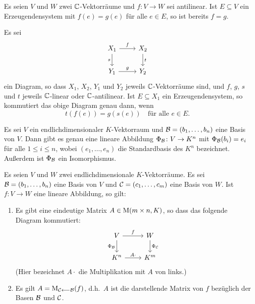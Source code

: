 \documentclass[a4paper,10pt]{article}
\begin{document}
\begin{lemma}
  Es seien $V$ und $W$ zwei $\mathbb{C}$-Vektorräume und $f \colon V \to W$ sei antilinear.
  Ist $E \subseteq V$ ein Erzeugendensystem mit $f(e) = g(e)$ für alle $e \in E$, so ist bereits $f = g$.
\end{lemma}



\begin{corollary}
  Es sei
  \[
    \begin{tikzcd}
        X_1
        \arrow[r, "f"]
        \arrow[d, "s"']
      & X_2
        \arrow[d, "t"]
      \\
        Y_1
        \arrow[r, "g"]
      & Y_2
    \end{tikzcd}
  \]
  ein Diagram, so dass $X_1$, $X_2$, $Y_1$ und $Y_2$ jeweils $\mathbb{C}$-Vektorräume sind, und $f$, $g$, $s$ und $t$ jeweils $\mathbb{C}$-linear oder $\mathbb{C}$-antilinear.
  Ist $E \subseteq X_1$ ein Erzeugendensystem, so kommutiert das obige Diagram genau dann, wenn
  \[
    t(f(e)) = g(s(e))
    \quad
    \text{für alle $e \in E$}.
  \]
\end{corollary}


\begin{lemma}
  Es sei $V$ ein endlichdimensionaler $K$-Vektorraum und $\mathcal{B} = (b_1, \dotsc, b_n)$ eine Basis von $V$.
  Dann gibt es genau eine lineare Abbildung $\Phi_{\mathcal{B}} \colon V \to K^n$ mit $\Phi_{\mathcal{B}}(b_i) = e_i$ für alle $1 \leq i \leq n$, wobei $(e_1, \dotsc, e_n)$ die Standardbasis des $K^n$ bezeichnet.
  Außerdem ist $\Phi_{\mathcal{B}}$ ein Isomorphismus.
\end{lemma}


\begin{lemma}
  Es seien $V$ und $W$ zwei endlichdimensionale $K$-Vektorräume.
  Es sei $\mathcal{B} = (b_1, \dotsc, b_n)$ eine Basis von $V$ und $\mathcal{C} = (c_1, \dotsc, c_m)$ eine Basis von $W$.
  Ist $f \colon V \to W$ eine lineare Abbildung, so gilt:
  \begin{enumerate}[leftmargin=*]
  
    \item
      Es gibt eine eindeutige Matrix $A \in \operatorname{M}(m \times n, K)$, so dass das folgende Diagram kommutiert:
      \[
        \begin{tikzcd}
            V \arrow[r, "f"] \arrow[d, "\Phi_\mc{B}"']
          & W \arrow[d, "\Phi_\mc{C}"]
          \\
            {K^n} \arrow[r, "A \cdot"]
          & {K^m}
        \end{tikzcd}
      \]
      (Hier bezeichnet $A \cdot$ die Multiplikation mit $A$ von links.)
    
    \item
      Es gilt $A = \operatorname{M}_{\mathcal{C} \longleftarrow \mathcal{B}}(f)$, d.h.\ $A$ ist die darstellende Matrix von $f$ bezüglich der Basen $\mathcal{B}$ und $\mathcal{C}$.
  \end{enumerate}
\end{lemma}
\end{document}
